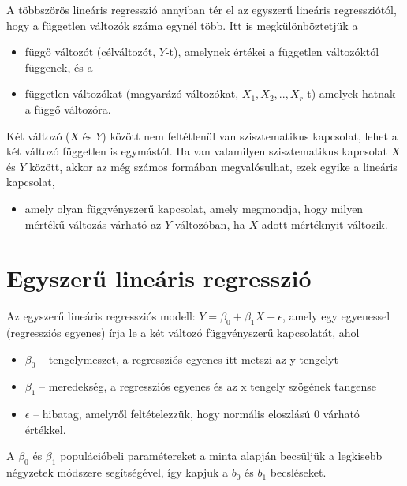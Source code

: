 \documentclass[
  letterpaper,
]{krantz}
\providecommand{\tightlist}{%
  \setlength{\itemsep}{0pt}\setlength{\parskip}{0pt}}\usepackage{longtable,booktabs,array}
\begin{document}
A többszörös lineáris regresszió annyiban tér el az egyszerű lineáris
regressziótól, hogy a független változók száma egynél több. Itt is
megkülönböztetjük a

\begin{itemize}
\tightlist
\item
  függő változót (célváltozót, \(Y\)-t), amelynek értékei a független
  változóktól függenek, és a
\item
  független változókat (magyarázó változókat, \(X_1,X_2,..,X_r\)-t)
  amelyek hatnak a függő változóra.
\end{itemize}

Két változó (\(X\) és \(Y\)) között nem feltétlenül van szisztematikus
kapcsolat, lehet a két változó független is egymástól. Ha van valamilyen
szisztematikus kapcsolat \(X\) és \(Y\) között, akkor az még számos
formában megvalósulhat, ezek egyike a lineáris kapcsolat,

\begin{itemize}
\tightlist
\item
  amely olyan függvényszerű kapcsolat, amely megmondja, hogy milyen
  mértékű változás várható az \(Y\) változóban, ha \(X\) adott
  mértéknyit változik.
\end{itemize}

\hypertarget{egyszerux171-lineuxe1ris-regressziuxf3}{%
\section{Egyszerű lineáris
regresszió}\label{egyszerux171-lineuxe1ris-regressziuxf3}}

Az egyszerű lineáris regressziós modell: \(Y=\beta_0+β_1 X+\epsilon\),
amely egy egyenessel (regressziós egyenes) írja le a két változó
függvényszerű kapcsolatát, ahol

\begin{itemize}
\tightlist
\item
  \(\beta_0\) -- tengelymeszet, a regressziós egyenes itt metszi az y
  tengelyt
\item
  \(\beta_1\) -- meredekség, a regressziós egyenes és az x tengely
  szögének tangense
\item
  \(\epsilon\) -- hibatag, amelyről feltételezzük, hogy normális
  eloszlású 0 várható értékkel.
\end{itemize}

A \(\beta_0\) és \(\beta_1\) populációbeli paramétereket a minta alapján
becsüljük a legkisebb négyzetek módszere segítségével, így kapjuk a
\(b_0\) és \(b_1\) becsléseket.
\end{document}
